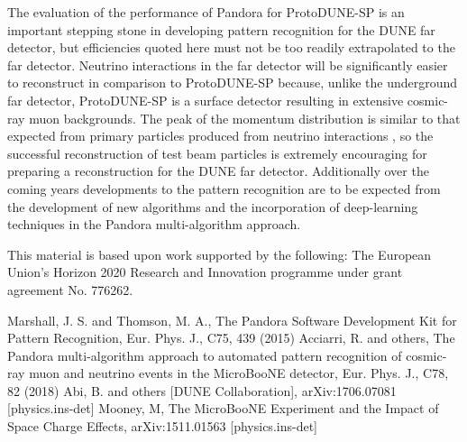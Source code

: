 The evaluation of the performance of Pandora for ProtoDUNE-SP is an important stepping stone in developing pattern recognition for the DUNE far detector, but efficiencies quoted here must not be too readily extrapolated to the far detector.  Neutrino interactions in the far detector will be significantly easier to reconstruct in comparison to ProtoDUNE-SP because, unlike the underground far detector, ProtoDUNE-SP is a surface detector resulting in extensive cosmic-ray muon backgrounds.  The peak of the momentum distribution is  similar to that expected from primary particles produced from neutrino interactions , so the successful reconstruction of test beam particles is extremely encouraging for preparing a reconstruction for the DUNE far detector.  Additionally over the coming years developments to the pattern recognition are to be expected from the development of new algorithms and the incorporation of deep-learning techniques in the Pandora multi-algorithm approach.  

\begin{acknowledgements}
This material is based upon work supported by the following: The European Union’s Horizon 2020 Research and Innovation programme under grant agreement No. 776262.
\end{acknowledgements}


\begin{thebibliography}{}
%
%
Marshall, J. S. and Thomson, M. A., The Pandora Software Development Kit for Pattern Recognition, Eur. Phys. J., C75, 439 (2015)
Acciarri, R. and others, The Pandora multi-algorithm approach to automated pattern recognition of cosmic-ray muon and neutrino events in the MicroBooNE detector, Eur. Phys. J., C78, 82 (2018)
Abi, B. and others [DUNE Collaboration], arXiv:1706.07081 [physics.ins-det]
Mooney, M, The MicroBooNE Experiment and the Impact of Space Charge Effects, arXiv:1511.01563 [physics.ins-det]
\end{thebibliography}



